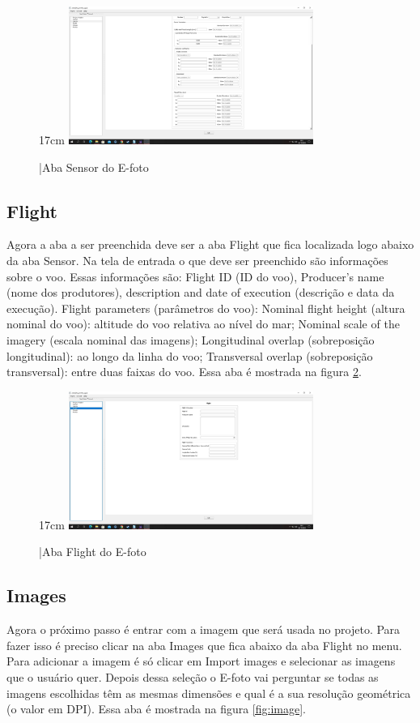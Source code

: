\begin{figure}[!ht]{17cm}
	\includegraphics[width=8cm, center]{figuras/sensor2.jpg}
	\caption{|Aba Sensor do E-foto} \label{fig:sensor2}
\end{figure}

\subsection{Flight}
Agora a aba a ser preenchida deve ser a aba Flight que fica localizada logo abaixo da aba Sensor. Na tela de entrada o que deve ser preenchido são informações sobre o voo. Essas informações são: Flight ID (ID do voo), Producer’s name (nome dos produtores), description and date of execution (descrição e data da execução). Flight parameters (parâmetros do voo): Nominal flight height (altura nominal do voo): altitude do voo relativa ao nível do mar; Nominal scale of the imagery (escala nominal das imagens); Longitudinal overlap (sobreposição longitudinal): ao longo da linha do voo; Transversal overlap (sobreposição transversal): entre duas faixas do voo. Essa aba é mostrada na figura \ref{fig:flight}.

\begin{figure}[!ht]{17cm}
	\includegraphics[width=8cm, center]{figuras/flight.jpg}
	\caption{|Aba Flight do E-foto} \label{fig:flight}
\end{figure}

\subsection{Images}
Agora o próximo passo é entrar com a imagem que será usada no projeto. Para fazer isso é preciso clicar na aba Images que fica abaixo da aba Flight no menu. Para adicionar a imagem é só clicar em Import images e selecionar as imagens que o usuário quer. Depois dessa seleção o E-foto vai perguntar se todas as imagens escolhidas têm as mesmas dimensões e qual é a sua resolução geométrica (o valor em DPI). Essa aba é mostrada na figura \ref{fig:image}. 

